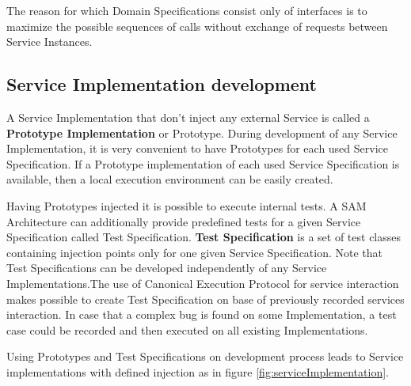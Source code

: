The reason for which Domain Specifications consist only of interfaces is to maximize the possible sequences of calls without exchange of requests between Service Instances.

\subsection{Service Implementation development}
\label{sec:intImpleDEVEL}



A Service Implementation that don't inject any external Service is called a \textbf{Prototype Implementation} or Prototype. During development of any Service Implementation, it is very convenient to have Prototypes for each used Service Specification. If a Prototype implementation of each used Service Specification is available, then a local execution environment can be easily created.


Having Prototypes injected it is possible to execute internal tests. A SAM Architecture can additionally provide predefined tests for a given Service Specification called Test Specification. \textbf{Test Specification} is a set of test classes containing injection points only for one given Service Specification. Note that Test Specifications can be developed independently of any Service Implementations.The use of Canonical Execution Protocol for service interaction makes possible to create Test Specification on base of previously recorded services interaction. In case that a complex bug is found on some Implementation, a test case could be recorded and then executed on all existing Implementations.

Using Prototypes and Test Specifications on development process leads to Service implementations with defined injection as in figure \ref{fig:serviceImplementation}.

